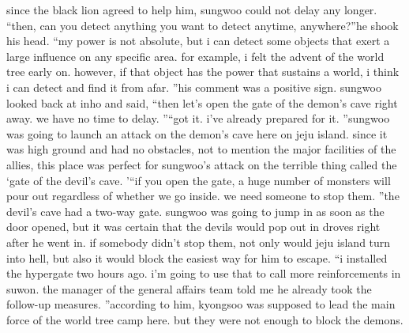 since the black lion agreed to help him, sungwoo could not delay any longer.
“then, can you detect anything you want to detect anytime, anywhere?”he shook his head.
“my power is not absolute, but i can detect some objects that exert a large influence on any specific area.
 for example, i felt the advent of the world tree early on.
 however, if that object has the power that sustains a world, i think i can detect and find it from afar.
”his comment was a positive sign.
sungwoo looked back at inho and said, “then let’s open the gate of the demon’s cave right away.
 we have no time to delay.
”“got it.
 i’ve already prepared for it.
”sungwoo was going to launch an attack on the demon’s cave here on jeju island.
since it was high ground and had no obstacles, not to mention the major facilities of the allies, this place was perfect for sungwoo’s attack on the terrible thing called the ‘gate of the devil’s cave.
’“if you open the gate, a huge number of monsters will pour out regardless of whether we go inside.
 we need someone to stop them.
”the devil’s cave had a two-way gate.
 sungwoo was going to jump in as soon as the door opened, but it was certain that the devils would pop out in droves right after he went in.
if somebody didn’t stop them, not only would jeju island turn into hell, but also it would block the easiest way for him to escape.
“i installed the hypergate two hours ago.
 i’m going to use that to call more reinforcements in suwon.
 the manager of the general affairs team told me he already took the follow-up measures.
”according to him, kyongsoo was supposed to lead the main force of the world tree camp here.
 but they were not enough to block the demons.

